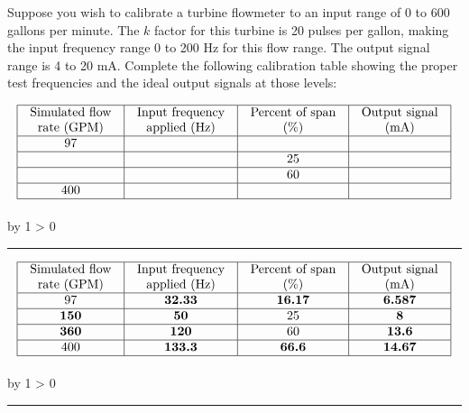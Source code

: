 \documentclass[12pt,a4paper]{article}
\def\svar{
           \advance\answnum by 1
           \ifnum \answnum > 0
                \hrule
                \vskip 3pt
                \leftline{Svar \the\answnum}
                \vskip 3pt \fi}
\def\notes{
           \advance\explnum by 1
           \ifnum \explnum > 0
                \hrule
                \vskip 3pt
                \leftline{Notes \the\explnum}
                \vskip 3pt \fi}
\begin{document}
Suppose you wish to calibrate a turbine flowmeter to an input range of 0 to 600 gallons per minute.  The $k$ factor for this turbine is 20 pulses per gallon, making the input frequency range 0 to 200 Hz for this flow range.  The output signal range is 4 to 20 mA.  Complete the following calibration table showing the proper test frequencies and the ideal output signals at those levels:


$$\vbox{\offinterlineskip
\halign{\strut
\vrule \quad\hfil # \ \hfil & 
\vrule \quad\hfil # \ \hfil & 
\vrule \quad\hfil # \ \hfil & 
\vrule \quad\hfil # \ \hfil \vrule \cr
\noalign{\hrule}
%
Simulated flow & Input frequency & Percent of span & Output signal \cr
%
rate (GPM) & applied (Hz) & (\%) & (mA) \cr
%
\noalign{\hrule}
%
97 &  &  &  \cr
%
\noalign{\hrule}
%
 &  & 25 &  \cr
%
\noalign{\hrule}
%
 &  & 60 &  \cr
%
\noalign{\hrule}
%
400 &  &  &  \cr
%
\noalign{\hrule}
} %
}$$ %

\vskip 10pt \filbreak 





\svar{} 


$$\vbox{\offinterlineskip
\halign{\strut
\vrule \quad\hfil # \ \hfil & 
\vrule \quad\hfil # \ \hfil & 
\vrule \quad\hfil # \ \hfil & 
\vrule \quad\hfil # \ \hfil \vrule \cr
\noalign{\hrule}
%
Simulated flow & Input frequency & Percent of span & Output signal \cr
%
rate (GPM) & applied (Hz) & (\%) & (mA) \cr
%
\noalign{\hrule}
%
97 & {\bf 32.33}  & {\bf 16.17} & {\bf 6.587} \cr
%
\noalign{\hrule}
%
{\bf 150} & {\bf 50} & 25 & {\bf 8} \cr
%
\noalign{\hrule}
%
{\bf 360} & {\bf 120} & 60 & {\bf 13.6} \cr
%
\noalign{\hrule}
%
400 & {\bf 133.3} & {\bf 66.6} & {\bf 14.67} \cr
%
\noalign{\hrule}
} %
}$$ %

\vskip 10pt \filbreak 





\notes{} 


\end{document}

